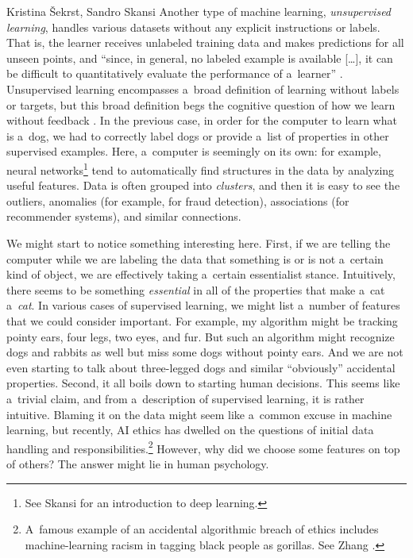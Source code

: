 \begin{artengenv2auth}{Kristina Šekrst, Sandro Skansi}
Another type of machine learning, \textit{unsupervised learning}, handles various datasets without any explicit instructions or labels. That is, the learner receives unlabeled training data and makes predictions for all unseen points, and ``since, in general, no labeled example is available [\ldots], it can be difficult to quantitatively evaluate the performance of a~learner''
\parencite[][p.7]{mohri_foundations_2018}. %
 Unsupervised learning encompasses a~broad definition of learning without labels or targets, but this broad definition begs the cognitive question of how we learn without feedback 
\parencite[][p.70]{skansi_introduction_2018}. %
 In the previous case, in order for the computer to learn what is a~dog, we had to correctly label dogs or provide a~list of properties in other supervised examples. Here, a~computer is seemingly on its own: for example, neural networks\footnote{See Skansi 
\parencite*[][]{skansi_introduction_2018} %
 for an introduction to deep learning.} tend to automatically find structures in the data by analyzing useful features. Data is often grouped into \textit{clusters}, and then it is easy to see the outliers, anomalies (for example, for fraud detection), associations (for recommender systems), and similar connections.

We might start to notice something interesting here. First, if we are telling the computer while we are labeling the data that something is or is not a~certain kind of object, we are effectively taking a~certain essentialist stance. Intuitively, there seems to be something \textit{essential} in all of the properties that make a~cat a~\textit{cat}. In various cases of supervised learning, we might list a~number of features that we could consider important. For example, my algorithm might be tracking pointy ears, four legs, two eyes, and fur. But such an algorithm might recognize dogs and rabbits as well but miss some dogs without pointy ears. And we are not even starting to talk about three-legged dogs and similar ``obviously'' accidental properties. Second, it all boils down to starting human decisions. This seems like a~trivial claim, and from a~description of supervised learning, it is rather intuitive. Blaming it on the data might seem like a~common excuse in machine learning, but recently, AI ethics has dwelled on the questions of initial data handling and responsibilities.\footnote{A~famous example of an accidental algorithmic breach of ethics includes machine-learning racism in tagging black people as gorillas. See Zhang
\parencite*[][]{zhang_google_2015}.%
} However, why did we choose some features on top of others? The answer might lie in human psychology.


\end{artengenv2auth}
